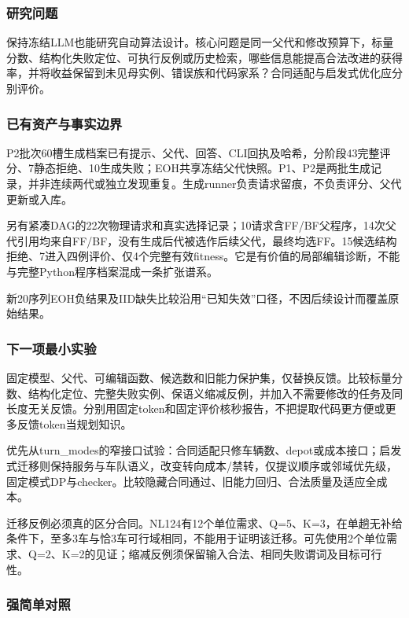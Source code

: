 \documentclass[11pt,a4paper]{article}
\newcommand{\bodytext}[1]{#1\par}
\begin{document}
\subsubsection{研究问题}
\bodytext{保持冻结LLM也能研究自动算法设计。核心问题是同一父代和修改预算下，标量分数、结构化失败定位、可执行反例或历史检索，哪些信息能提高合法改进的获得率，并将收益保留到未见母实例、错误族和代码家系？合同适配与启发式优化应分别评价。}
\subsubsection{已有资产与事实边界}
\bodytext{P2批次60槽生成档案已有提示、父代、回答、CLI回执及哈希，分阶段43完整评分、7静态拒绝、10生成失败；EOH共享冻结父代快照。P1、P2是两批生成记录，并非连续两代或独立发现重复。生成runner负责请求留痕，不负责评分、父代更新或入库。}
\bodytext{另有紧凑DAG的22次物理请求和真实选择记录；10请求含FF/\allowbreak{}BF父程序，14次父代引用均来自FF/\allowbreak{}BF，没有生成后代被选作后续父代，最终均选FF。15候选结构拒绝、7进入四例评价、仅4个完整有效fitness。它是有价值的局部编辑诊断，不能与完整Python程序档案混成一条扩张谱系。}
\bodytext{新20序列EOH负结果及IID缺失比较沿用“已知失效”口径，不因后续设计而覆盖原始结果。}
\subsubsection{下一项最小实验}
\bodytext{固定模型、父代、可编辑函数、候选数和旧能力保护集，仅替换反馈。比较标量分数、结构化定位、完整失败实例、保语义缩减反例，并加入不需要修改的任务及同长度无关反馈。分别用固定token和固定评价核秒报告，不把提取代码更方便或更多反馈token当规划知识。}
\bodytext{优先从turn\_\allowbreak{}modes的窄接口试验：合同适配只修车辆数、depot或成本接口；启发式迁移则保持服务与车队语义，改变转向成本/\allowbreak{}禁转，仅提议顺序或邻域优先级，固定模式DP与checker。比较隐藏合同通过、旧能力回归、合法质量及适应全成本。}
\bodytext{迁移反例必须真的区分合同。NL124有12个单位需求、Q=5、K=3，在单趟无补给条件下，至多3车与恰3车可行域相同，不能用于证明该迁移。可先使用2个单位需求、Q=2、K=2的见证；缩减反例须保留输入合法、相同失败谓词及目标可行性。}
\subsubsection{强简单对照}
\end{document}
